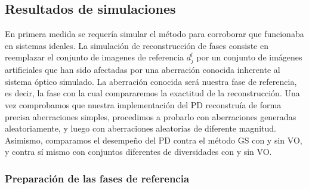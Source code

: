 \subsection{Resultados de simulaciones}
\label{sec:ChPD_resultados_simulados}
En primera medida se requería simular el método para corroborar que
funcionaba en sistemas ideales. La simulación de reconstrucción de
fases consiste en reemplazar el conjunto de imagenes de referencia $d_j^l$ por un
conjunto de imágenes artificiales que han sido afectadas por una
aberración conocida inherente al sistema
óptico simulado. La aberración conocida será nuestra fase de
referencia, es decir, la fase con la cual compararemos la exactitud de
la reconstrucción. 
Una vez comprobamos que nuestra implementación del PD reconstruía de
forma precisa aberraciones simples, procedimos a probarlo con
aberraciones generadas aleatoriamente, y luego con aberraciones aleatorias de
diferente magnitud. Asimismo, comparamos el desempeño del PD contra el
método GS con y sin VO, y contra sí mismo con conjuntos diferentes de
diversidades con y sin VO.  

\subsubsection{Preparación de las fases de referencia}

